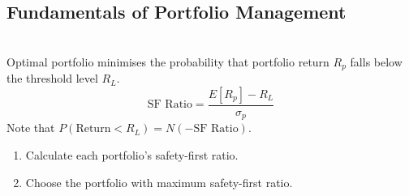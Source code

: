 \subsection{Fundamentals of Portfolio Management}

\begin{definition}  \\
Optimal portfolio minimises the probability that portfolio return $R_p$ falls below the threshold level $R_L$.
\begin{equation}
\text{SF Ratio} = \frac{E[R_p] - R_L}{\sigma_p} \nonumber
\end{equation}
Note that $P(\text{Return} < R_L) = N(-\text{SF Ratio})$.
\begin{enumerate}[label=\roman*.]
\setlength{\itemsep}{0pt}
\item Calculate each portfolio's safety-first ratio.
\item Choose the portfolio with maximum safety-first ratio.
\end{enumerate}
\end{definition}

\begin{definition} 
\end{definition}

\begin{definition} 
\end{definition}

\begin{definition} 
\end{definition}

\begin{definition} 
\end{definition}



